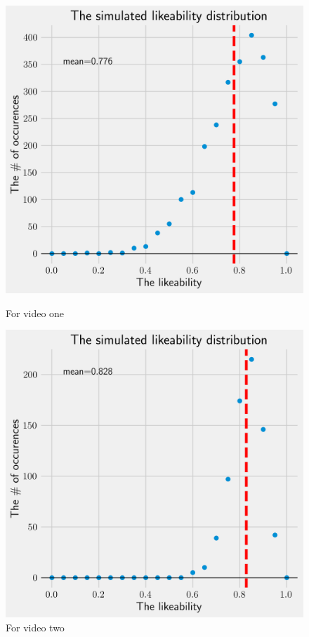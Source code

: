 \documentclass[a4paper,11pt]{article}
\begin{document}
\begin{figure}
    \centering
    \begin{minipage}{.5\textwidth}
        \centering
        \includegraphics[width=0.9\linewidth]{assets/sim_ratings_v1.png}
        \caption{For video one}
        \label{fig:sim_ratings_v1}
    \end{minipage}%
    \begin{minipage}{.5\textwidth}
        \centering
        \includegraphics[width=0.9\linewidth]{assets/sim_ratings_v2.png}
        \caption{For video two}
        \label{fig:sim_ratings_v2}
    \end{minipage}
\end{figure}
\end{document}
